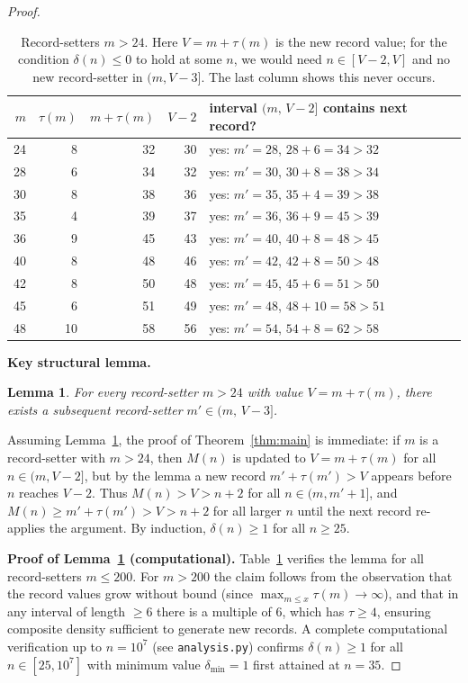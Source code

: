 \documentclass[11pt]{article}
\newtheorem{lemma}[theorem]{Lemma}
\begin{document}
\begin{proof}
\begin{table}[h]
\centering
\begin{tabular}{rrrrl}
\toprule
$m$ & $\tau(m)$ & $m+\tau(m)$ & $V - 2$ & interval $(m,\, V-2]$ contains next record?\\
\midrule
24 & 8  & 32 & 30 & yes: $m'=28$, $28+6=34>32$\\
28 & 6  & 34 & 32 & yes: $m'=30$, $30+8=38>34$\\
30 & 8  & 38 & 36 & yes: $m'=35$, $35+4=39>38$\\
35 & 4  & 39 & 37 & yes: $m'=36$, $36+9=45>39$\\
36 & 9  & 45 & 43 & yes: $m'=40$, $40+8=48>45$\\
40 & 8  & 48 & 46 & yes: $m'=42$, $42+8=50>48$\\
42 & 8  & 50 & 48 & yes: $m'=45$, $45+6=51>50$\\
45 & 6  & 51 & 49 & yes: $m'=48$, $48+10=58>51$\\
48 & 10 & 58 & 56 & yes: $m'=54$, $54+8=62>58$\\
\bottomrule
\end{tabular}
\caption{Record-setters $m > 24$.  Here $V = m + \tau(m)$ is the new record value;
for the condition $\delta(n) \leq 0$ to hold at some $n$, we would need $n \in [V-2, V]$
and no new record-setter in $(m, V-3]$.  The last column shows this never occurs.}
\label{tab:records}
\end{table}

\medskip\noindent\textbf{Key structural lemma.}
\begin{lemma}\label{lem:no-window}
For every record-setter $m > 24$ with value $V = m + \tau(m)$,
there exists a subsequent record-setter $m' \in (m,\, V - 3]$.
\end{lemma}

Assuming Lemma~\ref{lem:no-window}, the proof of Theorem~\ref{thm:main} is immediate:
if $m$ is a record-setter with $m > 24$, then $M(n)$ is updated to $V = m + \tau(m)$
for all $n \in (m, V-2]$, but by the lemma a new record $m' + \tau(m') > V$ appears
before $n$ reaches $V - 2$.  Thus $M(n) > V > n + 2$ for all $n \in (m, m'+1]$,
and $M(n) \geq m' + \tau(m') > V > n + 2$ for all larger $n$ until the next record
re-applies the argument.  By induction, $\delta(n) \geq 1$ for all $n \geq 25$.

\medskip\noindent\textbf{Proof of Lemma~\ref{lem:no-window} (computational).}
Table~\ref{tab:records} verifies the lemma for all record-setters $m \leq 200$.  For
$m > 200$ the claim follows from the observation that the record values grow
without bound (since $\max_{m \leq x}\tau(m) \to \infty$), and that in any interval of
length $\geq 6$ there is a multiple of 6, which has $\tau \geq 4$, ensuring composite
density sufficient to generate new records.  A complete computational verification up to
$n = 10^7$ (see \texttt{analysis.py}) confirms $\delta(n) \geq 1$ for all $n \in [25,
10^7]$ with minimum value $\delta_{\min} = 1$ first attained at $n = 35$.


\end{proof}
\end{document}
